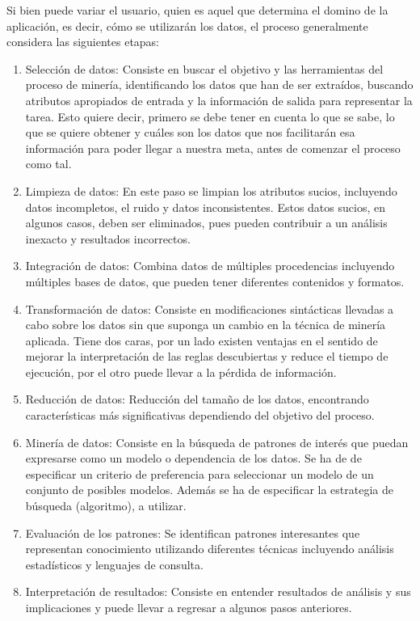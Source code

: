 Si bien puede variar el usuario, quien es aquel que determina el domino de la aplicación, es decir, cómo se utilizarán los datos, el proceso generalmente considera las siguientes etapas:

\begin{enumerate}
\item Selección de datos: Consiste en buscar el objetivo y las herramientas del proceso de minería, identificando los datos que han de ser extraídos, buscando atributos apropiados de entrada y la información de salida para representar la tarea. Esto quiere decir, primero se debe tener en cuenta lo que se sabe, lo que se quiere obtener y cuáles son los datos que nos facilitarán esa información para poder llegar a nuestra meta, antes de comenzar el proceso como tal.
\item Limpieza de datos: En este paso se limpian los atributos sucios, incluyendo datos incompletos, el ruido y datos inconsistentes. Estos datos sucios, en algunos casos, deben ser eliminados, pues pueden contribuir a un análisis inexacto y resultados incorrectos.
\item Integración de datos: Combina datos de múltiples procedencias incluyendo múltiples bases de datos, que pueden tener diferentes contenidos y formatos.
\item Transformación de datos: Consiste en modificaciones sintácticas llevadas a cabo sobre los datos sin que suponga un cambio en la técnica de minería aplicada. Tiene dos caras, por un lado existen ventajas en el sentido de mejorar la interpretación de las reglas descubiertas y reduce el tiempo de ejecución, por el otro puede llevar a la pérdida de información.
\item Reducción de datos: Reducción del tamaño de los datos, encontrando características más significativas dependiendo del objetivo del proceso.
\item Minería de datos: Consiste en la búsqueda de patrones de interés que puedan expresarse como un modelo o dependencia de los datos. Se ha de de especificar un criterio de preferencia para seleccionar un modelo de un conjunto de posibles modelos. Además se ha de especificar la estrategia de búsqueda (algoritmo), a utilizar.
\item Evaluación de los patrones: Se identifican patrones interesantes que representan conocimiento utilizando diferentes técnicas incluyendo análisis estadísticos y lenguajes de consulta.
\item Interpretación de resultados: Consiste en entender resultados de análisis y sus implicaciones y puede llevar a regresar a algunos pasos anteriores.
\end{enumerate}

